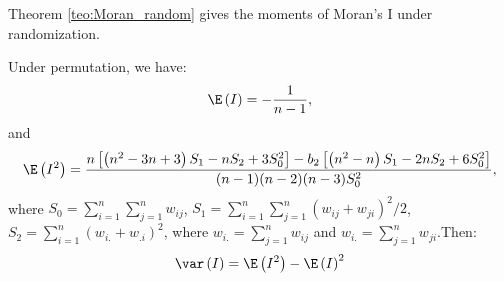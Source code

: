 \documentclass[english,12pt]{book}\usepackage[]{graphicx}\usepackage[]{xcolor}
\begin{document}









Theorem \ref{teo:Moran_random} gives the moments of Moran's I under randomization. 

\begin{theorem}\label{teo:Moran_random}
Under permutation, we have:
\begin{equation*}
\E\left(I\right) = - \frac{1}{n - 1}, 
\end{equation*}
%
and
\begin{equation*}
\E\left(I^2\right) = \frac{n\left[\left(n^2 - 3n + 3\right)S_1 - nS_2 + 3S_0^2\right]-b_2\left[\left(n^2 - n\right)S_1 - 2nS_2 + 6S_0^2\right]}{(n-1)(n-2)(n-3)S_0^2},
\end{equation*}
%
where $S_0=\sum_{i = 1}^n\sum_{j=1}^nw_{ij}$, $S_1= \sum_{i = 1}^n\sum_{j = 1}^n(w_{ij} + w_{ji})^2/2$, $S_2 = \sum_{i = 1}^n(w_{i.} + w_{.i})^2$, where $w_{i.}= \sum_{j = 1}^nw_{ij}$ and $w_{i.}=\sum_{j = 1}^nw_{ji}$.Then:
\begin{equation*}
\var\left(I\right)=\E\left(I^2\right) - \E\left(I\right)^2
\end{equation*}
\end{theorem}
\end{document}
